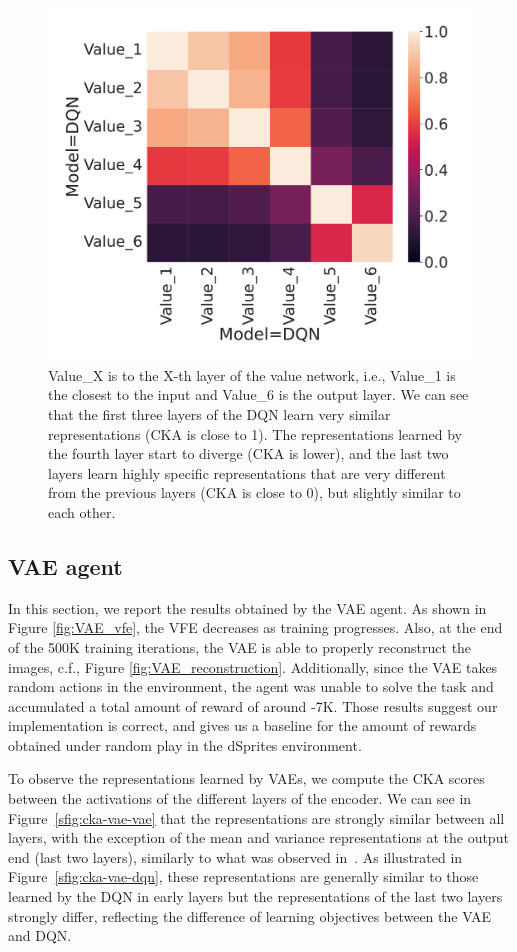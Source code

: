 \documentclass[twoside,11pt]{article}
\begin{document}
\begin{figure}[H]
    \centering
    \includegraphics[width=0.5\linewidth]{cka_figures/CKA_dqn_1_dqn_1}
    \caption{Value\_X is to the X-th layer of the value network, i.e., Value\_1 is the closest to the input and Value\_6 is the output layer. We can see that the first three layers of the DQN learn very similar representations (CKA is close to 1). The representations learned by the fourth layer start to diverge (CKA is lower), and the last two layers learn highly specific representations that are very different from the previous layers (CKA is close to 0), but slightly similar to each other.}\label{fig:cka-dqn}
\end{figure}

\subsection{VAE agent} \label{ssec:vae_results}

In this section, we report the results obtained by the VAE agent. As shown in Figure \ref{fig:VAE_vfe}, the VFE decreases as training progresses. Also, at the end of the 500K training iterations, the VAE is able to properly reconstruct the  images, c.f., Figure \ref{fig:VAE_reconstruction}. Additionally, since the VAE takes random actions in the environment, the agent was unable to solve the task and accumulated a total amount of reward of around -7K. Those results suggest our implementation is correct, and gives us a baseline for the amount of rewards obtained under random play in the dSprites environment.

To observe the representations learned by VAEs, we compute the CKA scores between the activations of the different layers of the encoder. We can see in Figure~\ref{sfig:cka-vae-vae} that the representations are strongly similar between all layers, with the exception of the mean and variance representations at the output end (last two layers), similarly to what was observed in~\citet{Bonheme2022}. As illustrated in Figure~\ref{sfig:cka-vae-dqn}, these representations are generally similar to those learned by the DQN in early layers but the representations of the last two layers strongly differ, reflecting the difference of learning objectives between the VAE and DQN.
\end{document}
